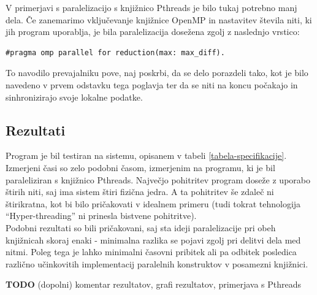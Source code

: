 \documentclass[a4paper,titlepage,11pt]{article}
\begin{document}
V primerjavi s paralelizacijo s knjižnico Pthreads je bilo tukaj potrebno manj dela. Če zanemarimo vključevanje knjižnice OpenMP in nastavitev števila niti, ki jih program uporablja, je bila paralelizacija dosežena zgolj z naslednjo vrstico:
\begin{lstlisting}
#pragma omp parallel for reduction(max: max_diff).
\end{lstlisting}
To navodilo prevajalniku pove, naj poskrbi, da se delo porazdeli tako, kot je bilo navedeno v prvem odstavku tega poglavja ter da se niti na koncu počakajo in sinhronizirajo svoje lokalne podatke.

\subsection{Rezultati}

Program je bil testiran na sistemu, opisanem v tabeli \ref{tabela-specifikacije}. \\
Izmerjeni časi so zelo podobni časom, izmerjenim na programu, ki je bil paraleliziran s knjižnico Pthreads. 
Največjo pohitritev program doseže z uporabo štirih niti, saj ima sistem štiri fizična jedra. A ta pohitritev še zdaleč ni štirikratna, kot bi bilo pričakovati v idealnem primeru (tudi tokrat tehnologija ``Hyper-threading'' ni prinesla bistvene pohitritve). \\
Podobni rezultati so bili pričakovani, saj sta ideji paralelizacije pri obeh knjižnicah skoraj enaki - minimalna razlika se pojavi zgolj pri delitvi dela med nitmi. Poleg tega je lahko minimalni časovni pribitek ali pa odbitek posledica različno učinkovitih implementacij paralelnih konstruktov v posamezni knjižnici.


\textbf{TODO} (dopolni) komentar rezultatov, grafi rezultatov, primerjava s Pthreads
\end{document}
